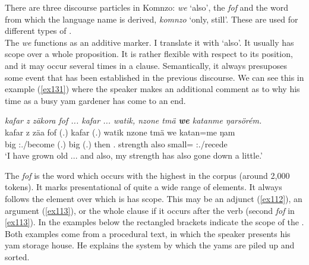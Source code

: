 There are three discourse particles in Komnzo: \emph{we} `also', the  \emph{fof} and the word from which the language name is derived, \emph{komnzo} `only, still'. These are used for different types of .\\

The  \emph{we} functions as an additive  marker. I translate it with  `also'. It usually has scope over a whole proposition. It is rather flexible with respect to its position, and it may occur several times in a clause. Semantically, it always presuposes some event that has been established in the previous discourse. We can see this in example (\ref{ex131}) where the speaker makes an additional comment as to why his time as a busy yam gardener has come to an end.

\begin{exe}
	\ex \emph{kafar z zäkora fof ... kafar ... watik, nzone tmä \textbf{we} katanme ŋarsörém.}\\
	\gll kafar z zäa fof (.) kafar (.) watik nzone tmä we katan=me ŋam\\
	big \Iam{} \Fsg:\Pst.\Pfv/become \Emph{} (.) big (.) then \Fsg{}.\Poss{} strength also small=\Ins{} \Stsg:\Rpst.\Dur/recede\\
	\trans `I have grown old ... and also, my strength has also gone down a little.'\\
	\label{ex131}
\end{exe}

The  \emph{fof} is the word which occurs with the highest  in the corpus (around 2,000 tokens). It marks presentational  of quite a wide range of elements. It always follows the element over which is has scope. This may be an adjunct (\ref{ex112}), an argument (\ref{ex113}), or the whole clause if it occurs after the verb (second \emph{fof} in \ref{ex113}). In the examples below the rectangled brackets indicate the scope of the . Both examples come from a procedural text, in which the speaker presents his yam storage house. He explains the system by which the yams are piled up and sorted.

